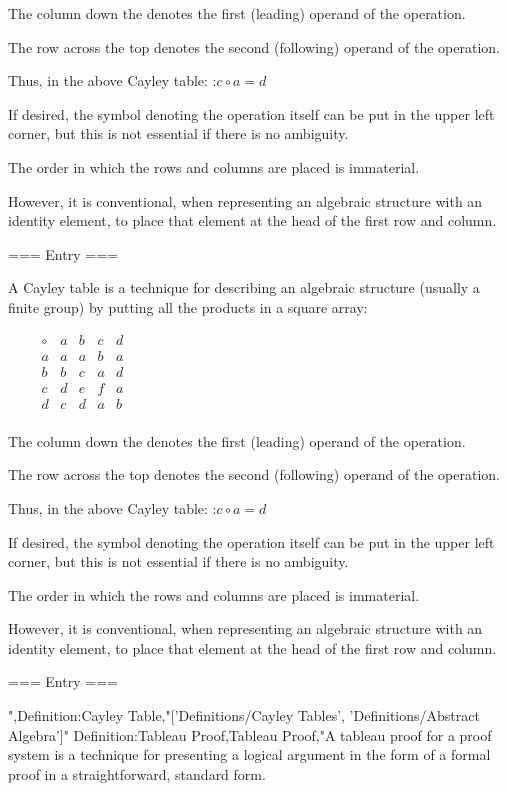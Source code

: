 The column down the  denotes the first (leading) operand of the operation.

The row across the top denotes the second (following) operand of the operation.

Thus, in the above Cayley table:
:$c \circ a = d$


If desired, the symbol denoting the operation itself can be put in the upper left corner, but this is not essential if there is no ambiguity.


The order in which the rows and columns are placed is immaterial.

However, it is conventional, when representing an algebraic structure with an identity element, to place that element at the head of the first row and column.


=== Entry ===

A Cayley table is a technique for describing an algebraic structure (usually a finite group) by putting all the products in a square array:

$\qquad \begin {array} {c|cccc}
\circ & a & b & c & d \\
\hline
a & a & a & b & a \\
b & b & c & a & d \\
c & d & e & f & a \\
d & c & d & a & b \\
\end {array}$


The column down the  denotes the first (leading) operand of the operation.

The row across the top denotes the second (following) operand of the operation.

Thus, in the above Cayley table:
:$c \circ a = d$


If desired, the symbol denoting the operation itself can be put in the upper left corner, but this is not essential if there is no ambiguity.


The order in which the rows and columns are placed is immaterial.

However, it is conventional, when representing an algebraic structure with an identity element, to place that element at the head of the first row and column.


=== Entry ===

",Definition:Cayley Table,"['Definitions/Cayley Tables', 'Definitions/Abstract Algebra']"
Definition:Tableau Proof,Tableau Proof,"A tableau proof for a proof system is a technique for presenting a logical argument in the form of a formal proof in a straightforward, standard form.

